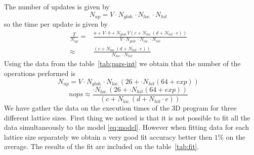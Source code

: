\documentclass[a4paper]{llncs}
\begin{document}
The number of updates is given by
\begin{equation}
N_{up}=V\cdot N_{glob.}\cdot N_{loc.}\cdot N_{hit}
\end{equation}
so the time per update is given by
\begin{equation}\begin{split}
\frac{T}{N_{up}}=&\frac{a+ V \cdot b + N_{glob.} V \left(c + N_{loc.}\left(d + N_{hit}\cdot e\right)\right)}{V\cdot N_{glob.}\cdot N_{loc.}\cdot N_{hit}}\\
\approx&
\frac{ \left(c + N_{loc.}\left(d + N_{hit}\cdot e\right)\right)}{N_{loc.}\cdot N_{hit}}
\end{split}
\end{equation}
Using the data from the table~\ref{tab:pars-int} we obtain that the number of the operations performed is
\begin{equation}
N_{up}=V\cdot N_{glob.}\cdot N_{loc.}(26+\cdot N_{hit}(64+exp))
\end{equation}
\begin{equation}
nops\approx \frac{\cdot N_{loc.}(26+\cdot N_{hit}(64+exp))}{ \left(c + N_{loc.}\left(d + N_{hit}\cdot e\right)\right)}
\end{equation}
We have gather the data on the execution times of the 3D program for
three different lattice sizes. First thing we noticed is that it is
not possible to fit all the data simultaneously to the model
\eqref{eq:model}. However when fitting data for each lattice size
separately we obtain a very good fit accuracy better then $1\%$ on the
average. The results of the fit are included on the table~\ref{tab:fit}.
\end{document}

